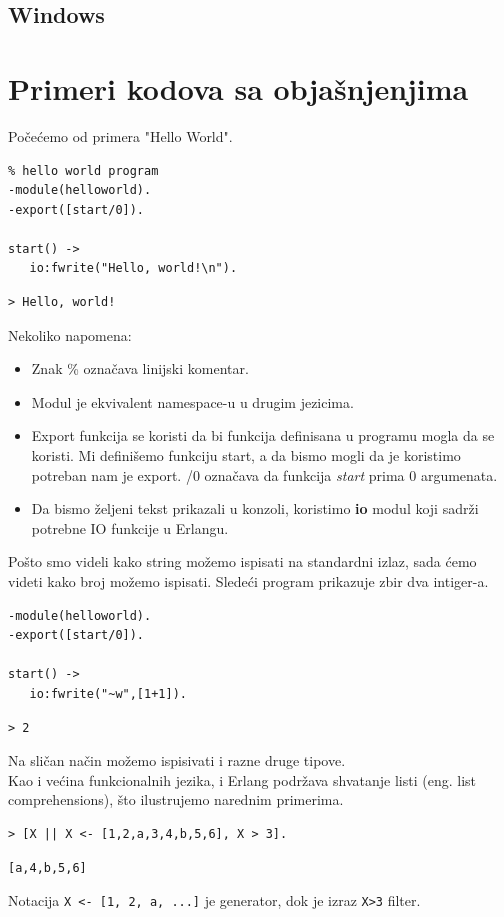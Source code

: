 \documentclass[a4paper]{article}
\begin{document}
{\subsection{Windows}
\label{subsec:instalacijaWindows}


\section{Primeri kodova sa objašnjenjima}
\label{sec:primeri}
Po\v ce\' cemo od primera "Hello World".  
\begin{verbatim}
% hello world program
-module(helloworld). 
-export([start/0]). 

start() -> 
   io:fwrite("Hello, world!\n").
\end{verbatim}
\begin{verbatim}
> Hello, world!
\end{verbatim}

Nekoliko napomena:
\begin{itemize}
  \item Znak \% ozna\v cava linijski komentar.
  \item Modul je ekvivalent namespace-u u drugim jezicima.
  \item Export funkcija se koristi da bi funkcija definisana u programu mogla da se koristi. Mi defini\v semo funkciju start, a da bismo mogli da je koristimo potreban nam je export. /0 ozna\v cava da funkcija \textit{start} prima 0 argumenata.
  \item Da bismo \v zeljeni tekst prikazali u konzoli, koristimo \textbf{io} modul koji sadr\v zi potrebne IO funkcije u Erlangu.
\end{itemize}

Po\v sto smo videli kako string mo\v zemo ispisati na standardni izlaz, sada \' cemo videti kako broj mo\v zemo ispisati. Slede\' ci program prikazuje zbir dva intiger-a.

\begin{verbatim}
-module(helloworld).
-export([start/0]).

start() ->
   io:fwrite("~w",[1+1]).
\end{verbatim}
\begin{verbatim}
> 2
\end{verbatim}

Na sli\v can na\v cin mo\v zemo ispisivati i razne druge tipove.\\

Kao i ve\' cina funkcionalnih jezika, i Erlang podr\v zava shvatanje listi (eng. list comprehensions), \v sto ilustrujemo narednim primerima.
\begin{verbatim}
> [X || X <- [1,2,a,3,4,b,5,6], X > 3].
\end{verbatim}
\begin{verbatim}
[a,4,b,5,6]
\end{verbatim}
Notacija {\texttt{X <- [1, 2, a, ...]}} je generator, dok je izraz {\texttt{X>3}} filter.\\

}
\end{document}
